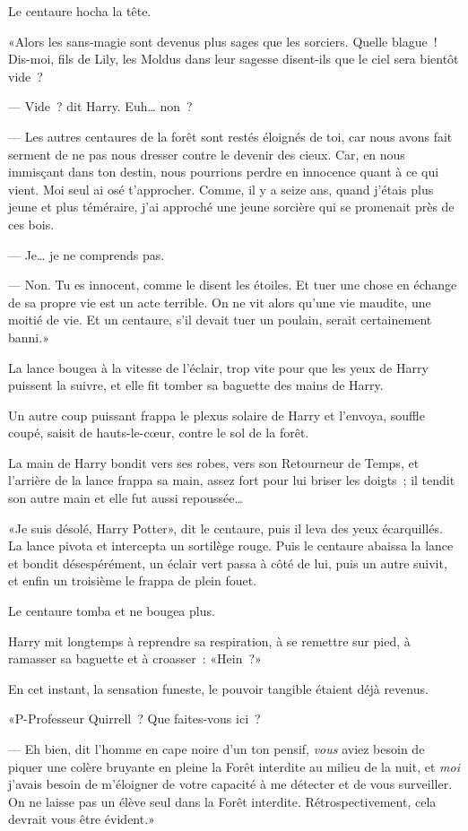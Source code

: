 Le centaure hocha la tête.

«Alors les sans-magie sont devenus plus sages que les sorciers. Quelle blague~! Dis-moi, fils de Lily, les Moldus dans leur sagesse disent-ils que le ciel sera bientôt vide~?

--- Vide~? dit Harry. Euh… non~?

--- Les autres centaures de la forêt sont restés éloignés de toi, car nous avons fait serment de ne pas nous dresser contre le devenir des cieux. Car, en nous immisçant dans ton destin, nous pourrions perdre en innocence quant à ce qui vient. Moi seul ai osé t'approcher. Comme, il y a seize ans, quand j'étais plus jeune et plus téméraire, j'ai approché une jeune sorcière qui se promenait près de ces bois.

--- Je… je ne comprends pas.

--- Non. Tu es innocent, comme le disent les étoiles. Et tuer une chose en échange de sa propre vie est un acte terrible. On ne vit alors qu'une vie maudite, une moitié de vie. Et un centaure, s'il devait tuer un poulain, serait certainement banni.»

La lance bougea à la vitesse de l'éclair, trop vite pour que les yeux de Harry puissent la suivre, et elle fit tomber sa baguette des mains de Harry.

Un autre coup puissant frappa le plexus solaire de Harry et l'envoya, souffle coupé, saisit de hauts-le-cœur, contre le sol de la forêt.

La main de Harry bondit vers ses robes, vers son Retourneur de Temps, et l'arrière de la lance frappa sa main, assez fort pour lui briser les doigts~; il tendit son autre main et elle fut aussi repoussée…

«Je suis désolé, Harry Potter», dit le centaure, puis il leva des yeux écarquillés. La lance pivota et intercepta un sortilège rouge. Puis le centaure abaissa la lance et bondit désespérément, un éclair vert passa à côté de lui, puis un autre suivit, et enfin un troisième le frappa de plein fouet.

Le centaure tomba et ne bougea plus.

Harry mit longtemps à reprendre sa respiration, à se remettre sur pied, à ramasser sa baguette et à croasser~: «Hein~?»

En cet instant, la sensation funeste, le pouvoir tangible étaient déjà revenus.

«P-Professeur Quirrell~? Que faites-vous ici~?

--- Eh bien, dit l'homme en cape noire d'un ton pensif, \emph{vous} aviez besoin de piquer une colère bruyante en pleine la Forêt interdite au milieu de la nuit, et \emph{moi} j'avais besoin de m'éloigner de votre capacité à me détecter et de vous surveiller. On ne laisse pas un élève seul dans la Forêt interdite. Rétrospectivement, cela devrait vous être évident.»


